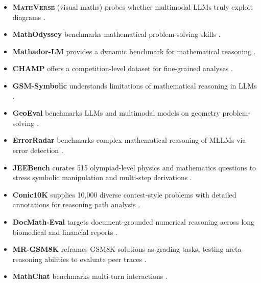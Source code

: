 \documentclass[acmsmall,anonymous]{acmart}
\begin{document}
\begin{itemize}
    \item \textbf{\textsc{MathVerse}} (visual maths) probes whether multimodal LLMs truly exploit diagrams \cite{zhang2024mathverse}.
    \item \textbf{MathOdyssey} benchmarks mathematical problem-solving skills \cite{fang2024}.
    \item \textbf{Mathador-LM} provides a dynamic benchmark for mathematical reasoning \cite{kurtic2024}.
    \item \textbf{CHAMP} offers a competition-level dataset for fine-grained analyses \cite{mao2024}.
    \item \textbf{GSM-Symbolic} understands limitations of mathematical reasoning in LLMs \cite{mirzadeh2024}.
    \item \textbf{GeoEval} benchmarks LLMs and multimodal models on geometry problem-solving \cite{zhang2024d}.
    \item \textbf{ErrorRadar} benchmarks complex mathematical reasoning of MLLMs via error detection \cite{yan2024a}.
    \item \textbf{JEEBench} curates 515 olympiad-level physics and mathematics questions to stress symbolic manipulation and multi-step derivations \cite{arora-2023-jeebench}.
    \item \textbf{Conic10K} supplies 10{,}000 diverse contest-style problems with detailed annotations for reasoning path analysis \cite{wu-2023-conic10k}.
    \item \textbf{DocMath-Eval} targets document-grounded numerical reasoning across long biomedical and financial reports \cite{zhao-2024-docmatheval}.
    \item \textbf{MR-GSM8K} reframes GSM8K solutions as grading tasks, testing meta-reasoning abilities to evaluate peer traces \cite{zeng-2024-mr-gsm8k}.
    \item \textbf{MathChat} benchmarks multi-turn interactions \cite{liang2024c}.
\end{itemize}
\end{document}
